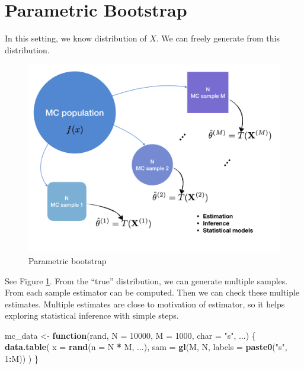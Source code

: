 \documentclass[]{book}
\newenvironment{Shaded}{\begin{snugshade}}{\end{snugshade}}
\newcommand{\ControlFlowTok}[1]{\textcolor[rgb]{0.13,0.29,0.53}{\textbf{#1}}}
\newcommand{\DataTypeTok}[1]{\textcolor[rgb]{0.13,0.29,0.53}{#1}}
\newcommand{\DecValTok}[1]{\textcolor[rgb]{0.00,0.00,0.81}{#1}}
\newcommand{\KeywordTok}[1]{\textcolor[rgb]{0.13,0.29,0.53}{\textbf{#1}}}
\newcommand{\NormalTok}[1]{#1}
\newcommand{\OperatorTok}[1]{\textcolor[rgb]{0.81,0.36,0.00}{\textbf{#1}}}
\newcommand{\StringTok}[1]{\textcolor[rgb]{0.31,0.60,0.02}{#1}}
\theoremstyle{definition}
\theoremstyle{definition}
\theoremstyle{definition}
\theoremstyle{remark}
\begin{document}
\hypertarget{parametric-bootstrap}{%
\section{Parametric Bootstrap}\label{parametric-bootstrap}}

In this setting, we know distribution of \(X\). We can freely generate from this distribution.

\begin{figure}[H]

{\centering \includegraphics[width=0.7\linewidth]{images/mcboot} 

}

\caption{Parametric bootstrap}\label{fig:paramboot}
\end{figure}

See Figure \ref{fig:paramboot}. From the ``true'' distribution, we can generate multiple samples. From each sample estimator can be computed. Then we can check these multiple estimates. Multiple estimates are close to motivation of estimator, so it helps exploring statistical inference with simple steps.

\begin{Shaded}
\begin{Highlighting}[]
\NormalTok{mc_data <-}\StringTok{ }\ControlFlowTok{function}\NormalTok{(rand, }\DataTypeTok{N =} \DecValTok{10000}\NormalTok{, }\DataTypeTok{M =} \DecValTok{1000}\NormalTok{, }\DataTypeTok{char =} \StringTok{"s"}\NormalTok{, ...) \{}
  \KeywordTok{data.table}\NormalTok{(}
    \DataTypeTok{x =} \KeywordTok{rand}\NormalTok{(}\DataTypeTok{n =}\NormalTok{ N }\OperatorTok{*}\StringTok{ }\NormalTok{M, ...),}
    \DataTypeTok{sam =} \KeywordTok{gl}\NormalTok{(M, N, }\DataTypeTok{labels =} \KeywordTok{paste0}\NormalTok{(}\StringTok{"s"}\NormalTok{, }\DecValTok{1}\OperatorTok{:}\NormalTok{M))}
\NormalTok{  )}
\NormalTok{\}}
\end{Highlighting}
\end{Shaded}
\end{document}
